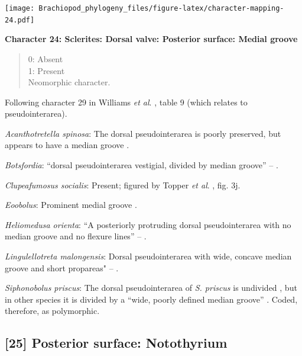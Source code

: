 \documentclass[openany]{book}
\theoremstyle{definition}
\theoremstyle{definition}
\theoremstyle{definition}
\theoremstyle{remark}
\begin{document}
\texttt{[image: Brachiopod\_phylogeny\_files/figure-latex/character-mapping-24.pdf]}

\textbf{Character 24: Sclerites: Dorsal valve: Posterior surface: Medial
groove}

\begin{quote}
0: Absent\\
1: Present\\
Neomorphic character.
\end{quote}

Following character 29 in Williams \emph{et al}.
\citeyearpar{Williams2000LinguliformeaCraniiformea}, table 9 (which
relates to pseudointerarea).

\hypertarget{Acanthotretella_spinosa-coding-24}{}
\emph{Acanthotretella spinosa}: The dorsal pseudointerarea is poorly
preserved, but appears to have a median groove
\citep{Holmer2006Aspinose}.

\hypertarget{Botsfordia-coding-24}{}
\emph{Botsfordia}: ``dorsal pseudointerarea vestigial, divided by median
groove'' -- \citet{Williams2000LinguliformeaCraniiformea}.

\hypertarget{Clupeafumosus_socialis-coding-24}{}
\emph{Clupeafumosus socialis}: Present; figured by Topper \emph{et al}.
\citeyearpar{Topper2013Reappraisalof}, fig. 3j.

\hypertarget{Eoobolus-coding-24}{}
\emph{Eoobolus}: Prominent medial groove
\citep{Balthasar2009Thebrachiopod}.

\hypertarget{Heliomedusa_orienta-coding-24}{}
\emph{Heliomedusa orienta}: ``A posteriorly protruding dorsal
pseudointerarea with no median groove and no flexure lines'' --
\citet{Chen2007Reinterpretationof}.

\hypertarget{Lingulellotreta_malongensis-coding-24}{}
\emph{Lingulellotreta malongensis}: Dorsal pseudointerarea with wide,
concave median groove and short propareas" --
\citet{Williams2000LinguliformeaCraniiformea}.

\hypertarget{Siphonobolus_priscus-coding-24}{}
\emph{Siphonobolus priscus}: The dorsal pseudointerarea of \emph{S.
priscus} is undivided \citep{Popov2009Earlyontogeny}, but in other
species it is divided by a ``wide, poorly defined median groove''
\citep{Williams2000LinguliformeaCraniiformea}. Coded, therefore, as
polymorphic.

\subsection*{{[}25{]} Posterior surface:
Notothyrium}\label{posterior-surface-notothyrium}
\end{document}
